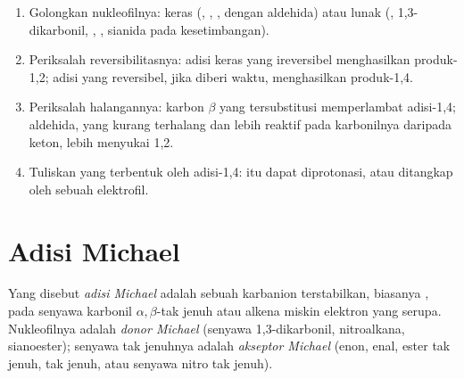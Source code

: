 \begin{method}\label{met:b2:conjugate-additions:predict-mode}
\begin{enumerate}
  \item Golongkan nukleofilnya: keras (, , ,  dengan aldehida)
        atau lunak (,  1,3-dikarbonil, , , sianida pada kesetimbangan).
  \item Periksalah reversibilitasnya: adisi keras yang ireversibel
        menghasilkan produk-1,2; adisi yang reversibel, jika diberi waktu,
        menghasilkan produk-1,4.
  \item Periksalah halangannya: karbon $\beta$ yang tersubstitusi
        memperlambat adisi-1,4; aldehida, yang kurang terhalang dan lebih
        reaktif pada karbonilnya daripada keton, lebih menyukai 1,2.
  \item Tuliskan  yang terbentuk oleh adisi-1,4:  itu dapat
        diprotonasi, atau ditangkap oleh sebuah elektrofil.
\end{enumerate}
\end{method}

\section{Adisi Michael}

\begin{definition}\label{def:b2:conjugate-additions:michael}
Yang disebut \emph{adisi Michael} adalah 
sebuah karbanion terstabilkan, biasanya , pada senyawa karbonil
$\alpha,\beta$-tak jenuh atau alkena miskin elektron yang serupa.
Nukleofilnya adalah \emph{donor Michael} (senyawa
1,3-dikarbonil, nitroalkana, sianoester); senyawa tak jenuhnya adalah
\emph{akseptor Michael}
(enon, enal, ester tak jenuh,  tak jenuh, atau senyawa nitro tak jenuh).
\end{definition}

